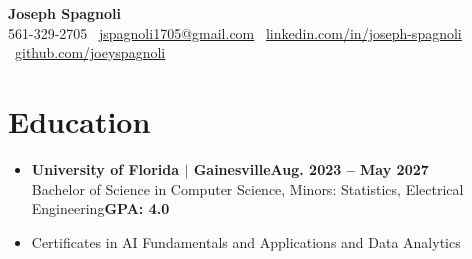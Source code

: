 \documentclass[letterpaper,10pt]{article}
\newcommand{\resumeSubHeadingListStart}{\begin{itemize}[leftmargin=0pt,label={},itemsep=2pt]}
\newcommand{\resumeSubHeadingListEnd}{\end{itemize}}
\newcommand{\resumeSubheading}[4]{\item {\textbf{#1}}\hfill{\textbf{#2}}\\
  {#3}\hfill{\textbf{#4}}}
\begin{document}
\vspace*{-0.45in}

\begin{center}
  {\fontsize{15pt}{16pt}\selectfont\bfseries Joseph Spagnoli}\\
  \vspace{2pt}
  {\normalsize 561-329-2705 \textbar\ \href{mailto:jspagnoli1705@gmail.com}{jspagnoli1705@gmail.com} \textbar\ 
  \href{https://www.linkedin.com/in/joseph-spagnoli/}{linkedin.com/in/joseph-spagnoli} \textbar\ 
  \href{https://github.com/joeyspagnoli}{github.com/joeyspagnoli}}
\end{center}

\section{\textbf{Education}}
\resumeSubHeadingListStart
  \resumeSubheading{University of Florida $|$ Gainesville}{Aug. 2023 -- May 2027}{Bachelor of Science in Computer Science, Minors: Statistics, Electrical Engineering}{GPA: 4.0}
  \item Certificates in AI Fundamentals and Applications and Data Analytics
\resumeSubHeadingListEnd

\end{document}
